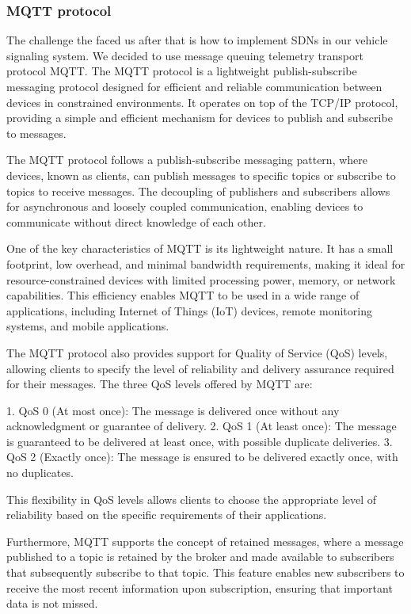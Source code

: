 \documentclass[
12pt,
oneside, 
onehalfspacing, 
nolistspacing, 
parskip, 
chapterinoneline, 
]{AASTCOMPUTER}
\begin{document}
\subsubsection{MQTT protocol}
The challenge the faced us after that is how to implement SDNs in our vehicle signaling system. We decided to use message queuing telemetry transport protocol MQTT. The MQTT protocol is a lightweight publish-subscribe messaging protocol designed for efficient and reliable communication between devices in constrained environments. It operates on top of the TCP/IP protocol, providing a simple and efficient mechanism for devices to publish and subscribe to messages.

The MQTT protocol follows a publish-subscribe messaging pattern, where devices, known as clients, can publish messages to specific topics or subscribe to topics to receive messages. The decoupling of publishers and subscribers allows for asynchronous and loosely coupled communication, enabling devices to communicate without direct knowledge of each other.

One of the key characteristics of MQTT is its lightweight nature. It has a small footprint, low overhead, and minimal bandwidth requirements, making it ideal for resource-constrained devices with limited processing power, memory, or network capabilities. This efficiency enables MQTT to be used in a wide range of applications, including Internet of Things (IoT) devices, remote monitoring systems, and mobile applications.

The MQTT protocol also provides support for Quality of Service (QoS) levels, allowing clients to specify the level of reliability and delivery assurance required for their messages. The three QoS levels offered by MQTT are:

1. QoS 0 (At most once): The message is delivered once without any acknowledgment or guarantee of delivery.
2. QoS 1 (At least once): The message is guaranteed to be delivered at least once, with possible duplicate deliveries.
3. QoS 2 (Exactly once): The message is ensured to be delivered exactly once, with no duplicates.

This flexibility in QoS levels allows clients to choose the appropriate level of reliability based on the specific requirements of their applications.

Furthermore, MQTT supports the concept of retained messages, where a message published to a topic is retained by the broker and made available to subscribers that subsequently subscribe to that topic. This feature enables new subscribers to receive the most recent information upon subscription, ensuring that important data is not missed.
\end{document}
